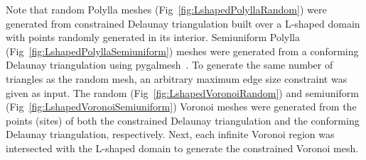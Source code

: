 \documentclass[lineno,pdflatex,sn-mathphys]{sn-jnl}%
\theoremstyle{thmstyleone}%
\theoremstyle{thmstyletwo}%
\theoremstyle{thmstylethree}%
\begin{document}
Note that random Polylla meshes (Fig~\ref{fig:LshapedPolyllaRandom}) were generated from constrained Delaunay triangulation built over  a L-shaped domain with points randomly generated in its interior. Semiuniform Polylla (Fig~\ref{fig:LshapedPolyllaSemiuniform}) meshes were generated  from a conforming Delaunay triangulation using pygalmesh~\cite{Schlomer_pygalmesh_Python_interface}. To generate the same number of triangles as the random mesh, an arbitrary maximum edge size constraint was given as input.  The random (Fig~\ref{fig:LshapedVoronoiRandom}) and semiuniform (Fig~\ref{fig:LshapedVoronoiSemiuniform}) Voronoi meshes were generated from  the points (sites) of both the  constrained Delaunay triangulation and the conforming Delaunay triangulation, respectively. Next, each infinite Voronoi region was intersected with the L-shaped domain to generate the constrained Voronoi mesh.
\end{document}
